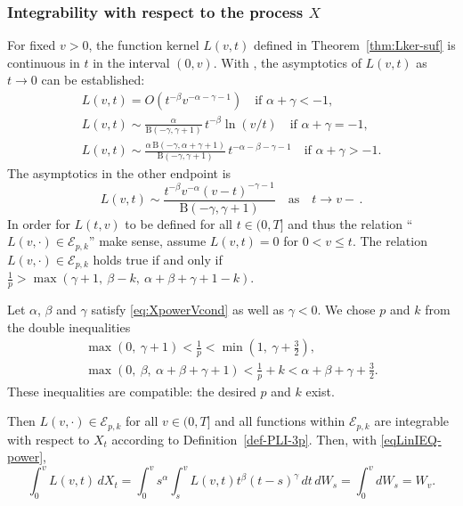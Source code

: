 \documentclass{article}
\theoremstyle{plain}
\theoremstyle{remark}
\theoremstyle{definition}
\begin{document}
\subsubsection*{Integrability
with respect to the process \boldmath$X$}
For fixed $v>0$, the function
kernel $L(v,t)$ defined in
Theorem~\ref{thm:Lker-suf}
is continuous in $t$ in the interval
$(0,v)$.
With \cite[Lemma~4]{Part 1},
the asymptotics of $L(v,t)$ as
$t \to 0$ can be established:
\begin{gather*}
L(v,t) = O(t^{-\beta} v^{-\alpha-\gamma-1})
  \quad
\mbox{if $\alpha+\gamma<-1$},\\
L(v,t) \sim \frac{\alpha}{\mathrm{B}(-\gamma,\gamma{+}1)} \,
t^{-\beta} \ln(v/t)
\quad \mbox{if $\alpha+\gamma=-1$},\\
L(v,t) \sim
\frac{\alpha\, \mathrm{B}(-\gamma,\alpha{+}\gamma{+}1)}
{\mathrm{B}(-\gamma,\gamma{+}1)} \,
t^{-\alpha-\beta-\gamma-1}
\quad \mbox{if $\alpha+\gamma>-1$}.
\end{gather*}
The asymptotics in the other endpoint
is
\[
L(v,t) \sim \frac{t^{-\beta} v^{-\alpha}
(v-t)^{-\gamma-1}}
{\mathrm{B}(-\gamma, \gamma{+}1)}
\quad
\mbox{as}
\quad t\to v{-}\,.
\]
In order for $L(t,v)$ to be defined for all $t\in(0,T]$
and thus the relation ``$L(v, \mathbin{\cdot}) \in
\mathcal{E}_{p,k}$'' make sense, assume
$L(v,t) = 0$ for $0<v\le t$.
The relation $L(v, \mathbin{\cdot}) \in
\mathcal{E}_{p,k}$ holds true
if and only if
$\frac{1}{p} > \max(\gamma{+}1,\:
\beta{-}k,\:
\alpha{+}\beta{+}\gamma{+}1{-}k)$.

Let $\alpha$, $\beta$ and $\gamma$
satisfy \eqref{eq:XpowerVcond}
as well as $\gamma<0$.
We chose $p$ and $k$ from the
double inequalities
\begin{equation}\label{eq:selpk}
\begin{gathered}
\max(0, \: \gamma+1)  < \frac{1}{p} <
\min\!\left(1, \: \gamma+{\textstyle\frac32}\right), \\
\max(0, \: \beta, \: \alpha+\beta+\gamma+1)
< \frac{1}{p}+k <
\alpha+\beta+\gamma+\frac32.
\end{gathered}
\end{equation}
These inequalities are compatible:
the desired $p$ and $k$ exist.

Then $L(v,\mathbin{\cdot})
\in \mathcal{E}_{p,k}$
for all $v\in(0,T]$
and all functions within $\mathcal{E}_{p,k}$
are integrable with respect to  $X_t$
according to  Definition~\ref{def-PLI-3p}.
Then, with \eqref{eqLinIEQ-power},
\[
\int_0^v L(v,t) \, dX_t
=
\int_0^v s^\alpha \int_s^v
L(v,t) t^\beta (t-s)^\gamma \, dt \, dW_s
= \int_0^v dW_s = W_v.
\]
 
\end{document}
